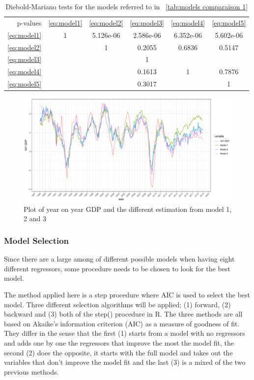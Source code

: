 \documentclass[12pt,a4paper,oneside]{book}
\begin{document}
\begin{table}[htp!]
    \caption{Diebold-Mariano tests for the models referred to in \ \autoref{tab:models comparaison 1} }
    \label{tab:Diebold Mariano 1}
     \centering \footnotesize
    \begin{tabular}{| r | c c c c c |}
    \cline{2-6}
 \multicolumn{0}{r|}{p-values}	& \ref{eq:model1} & \ref{eq:model2} & \ref{eq:model3} & \ref{eq:model4} & \ref{eq:model5} \\ \cline{1-6}
 \ref{eq:model1} & 1 & 5.126e-06  & 2.586e-06 & 6.352e-06 & 5.602e-06\\ 
 \ref{eq:model2} &   & 1  & 0.2055 & 0.6836 & 0.5147 \\
 \ref{eq:model3} &   &   & 1 & &   \\
 \ref{eq:model4} &   &   &  0.1613 & 1 & 0.7876 \\
 \ref{eq:model5} &   &   & 0.3017 &   & 1 \\ \cline{1-6}
\end{tabular}
\end{table}


\begin{figure}[!htbp]
    \centering
    \includegraphics[scale=0.5]{Graphs/predictions1.pdf}
    \caption{Plot of year on year GDP and the different estimation from model 1, 2 and 3}
    \label{fig:predictions1}
\end{figure}



\subsubsection{Model Selection}

Since there are a large among of different possible models when having eight different regressors, some procedure needs to be chosen to look for the best model.

The method applied here is a step procedure where AIC is used to select the best model.
Three different selection algorithms will be applied; (1) forward, (2) backward and  (3) both of the step() procedure in R. 
The three methods are all based on Akaike's information criterion (AIC) as a measure of goodness of fit. They differ in the sense that the first (1) starts from a model with no regressors and adds one by one the regressors that improve the most the model fit, the second (2) does the opposite, it starts with the full model and takes out the variables that don't improve the model fit and the last (3) is a mixed of the two previous methods.
\end{document}
